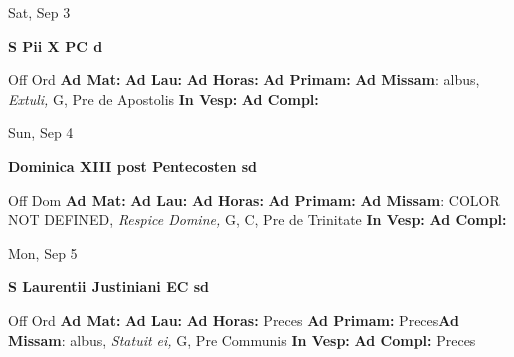 \documentclass[10pt]{memoir}
\begin{document}
\begin{center}
\begin{minipage}{3.5in}
\vspace{2em}
\begin{center}Sat, Sep 3
\end{center}
\textbf{ \large S Pii X PC
\textnormal{\normalsize d}}

\begin{justify}Off Ord
\textbf{Ad Mat: }
\textbf{Ad Lau: }
\textbf{Ad Horas: }
\textbf{Ad Primam: }\textbf{Ad Missam}: albus, \textit{Extuli,} G, Pre de Apostolis
\textbf{In Vesp: }
\textbf{Ad Compl: }
\end{justify}
\end{minipage}
\end{center}

\begin{center}
\begin{minipage}{3.5in}
\vspace{2em}
\begin{center}Sun, Sep 4
\end{center}
\textbf{ \large Dominica XIII post Pentecosten
\textnormal{\normalsize sd}}

\begin{justify}Off Dom
\textbf{Ad Mat: }
\textbf{Ad Lau: }
\textbf{Ad Horas: }
\textbf{Ad Primam: }\textbf{Ad Missam}: COLOR NOT DEFINED, \textit{Respice Domine,} G, C, Pre de Trinitate
\textbf{In Vesp: }
\textbf{Ad Compl: }
\end{justify}
\end{minipage}
\end{center}

\begin{center}
\begin{minipage}{3.5in}
\vspace{2em}
\begin{center}Mon, Sep 5
\end{center}
\textbf{ \large S Laurentii Justiniani EC
\textnormal{\normalsize sd}}

\begin{justify}Off Ord
\textbf{Ad Mat: }
\textbf{Ad Lau: }
\textbf{Ad Horas: }Preces
\textbf{Ad Primam: }Preces\textbf{Ad Missam}: albus, \textit{Statuit ei,} G, Pre Communis
\textbf{In Vesp: }
\textbf{Ad Compl: }Preces
\end{justify}
\end{minipage}
\end{center}
\end{document}
